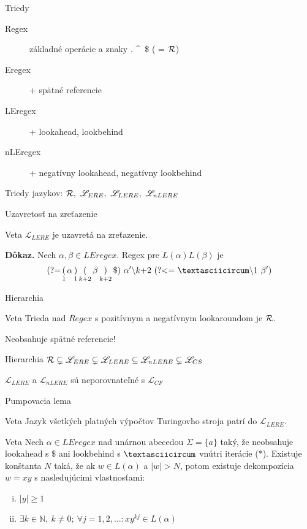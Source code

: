 \documentclass[mathserif]{beamer}
\def\R{{\cal R}} %
\def\L{\mathscr{L}} %
\def\N{\mathds{N}} %
\def\re{Regex}
\def\le{LEregex}
\def\el{\mathscr{L}_{ERE}}
\def\lel{\mathscr{L}_{LERE}}
\def\nlel{\mathscr{L}_{nLERE}}
\def\lookahead{\text{(?=}}
\def\lookbehind{\text{(?\textless =}}
\begin{document}
\begin{frame}{Triedy}
\begin{description}
\item[Regex] základné operácie a znaky . \textasciicircum ~\$ ( = $\R$)
\item[Eregex] + spätné referencie
\item[LEregex] + lookahead, lookbehind
\item[nLEregex] + negatívny lookahead, negatívny lookbehind
\end{description}
\vspace{30pt}
Triedy jazykov: $\R,~\el,~\lel,~\nlel$
\end{frame}

\begin{frame}{Uzavretosť na zreťazenie}
\begin{block}{Veta}
$\lel$ je uzavretá na zreťazenie.
\end{block}
\textbf{Dôkaz.} Nech $\alpha,\beta\in\le$. Regex pre $L(\alpha)L(\beta)$ je
$$
 \lookahead \mathop(_1 \alpha \mathop)_1 \mathop(_{k+2}\beta \mathop)_{k+2} \mathdollar) ~\alpha ' \backslash k\text{+2}~ \lookbehind ~\textasciicircum\backslash 1~\beta ')
$$
\end{frame}

\begin{frame}{Hierarchia}
\begin{block}{Veta}
Trieda nad $\re$ s pozitívnym a negatívnym lookaroundom je $\R$.
\end{block}
Neobsahuje spätné referencie!

\vspace{15pt}

\begin{block}{Hierarchia}
$\R \subsetneq \el \subsetneq \lel \subseteq \nlel \subsetneq \L_{CS}$
\end{block}
\begin{block}{}
$\lel$ a $\nlel$ sú neporovnateľné s $\L_{CF}$
\end{block}

\end{frame}

\begin{frame}{Pumpovacia lema}
\begin{block}{Veta}
Jazyk všetkých platných výpočtov Turingovho stroja patrí do $\lel$.
\end{block}

\begin{block}{Veta}
Nech $\alpha\in\le$ nad unárnou abecedou $\Sigma = \lbrace a \rbrace$ taký, že neobsahuje lookahead s $\mathdollar$ ani lookbehind s $\textasciicircum$ vnútri iterácie ($*$). Existuje konštanta $N$ taká, že ak $w \in L(\alpha)$ a $\vert w \vert > N$, potom existuje dekompozícia $w=xy$ s nasledujúcimi vlastnosťami:
\begin{enumerate}[(i)]
\item $\vert y \vert \geq 1$
\item $\exists k \in \N,~k\neq 0;~\forall j = 1,2,\ldots: xy^{kj} \in L(\alpha)$
\end{enumerate}
\end{block}
\end{frame}
\end{document}
